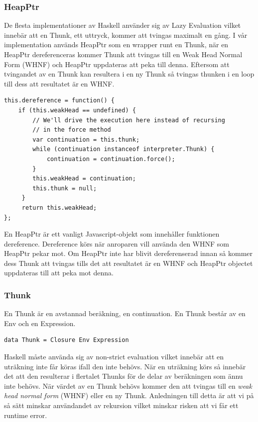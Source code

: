 \subsubsection{HeapPtr}
De flesta implementationer av Haskell använder sig av Lazy Evaluation vilket innebär att en Thunk, ett uttryck, kommer att tvingas maximalt en gång. I vår implementation används HeapPtr som en wrapper runt en Thunk, när en HeapPtr dereferenceras kommer Thunk att tvingas till en Weak Head Normal Form (WHNF) och HeapPtr uppdateras att peka till denna. Eftersom att tvingandet av en Thunk kan resultera i en ny Thunk så tvingas thunken i en loop till dess att resultatet är en WHNF.

\begin{lstlisting}
this.dereference = function() {
    if (this.weakHead == undefined) {
        // We'll drive the execution here instead of recursing 
        // in the force method
        var continuation = this.thunk;
        while (continuation instanceof interpreter.Thunk) {
            continuation = continuation.force();
        }
        this.weakHead = continuation;
        this.thunk = null;
     }
     return this.weakHead;
};
\end{lstlisting}
En HeapPtr är ett vanligt Javascript-objekt som innehåller funktionen dereference. Dereference körs när anroparen vill använda den WHNF som HeapPtr pekar mot. Om HeapPtr inte har blivit dereferenserad innan så kommer dess Thunk att tvingas tills det att resultatet är en WHNF och HeapPtr objectet uppdateras till att peka mot denna.

\subsubsection{Thunk}
En Thunk är en avstannad beräkning, en continuation. En Thunk består av en Env och en Expression.

\begin{lstlisting}
data Thunk = Closure Env Expression
\end{lstlisting}

Haskell måste använda sig av non-strict evaluation vilket innebär att en uträkning inte får köras ifall den inte behövs. När en uträkning körs så innebär det att den resulterar i flertalet Thunks för de delar av beräkningen som ännu inte behövs. När värdet av en Thunk behövs kommer den att tvingas till en \emph{weak head normal form} (WHNF) eller en ny Thunk. Anledningen till detta är att vi på så sätt minskar användandet av rekursion vilket minskar risken att vi får ett runtime error.

